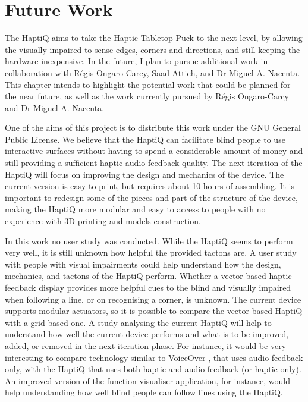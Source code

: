 \chapter{Future Work}
\label{chap:futureWork}

The HaptiQ aims to take the Haptic Tabletop Puck to the next level, by allowing the visually impaired to sense edges, corners and directions, and still keeping the hardware inexpensive. In the future, I plan to pursue additional work in collaboration with Régis Ongaro-Carcy, Saad Attieh, and Dr Miguel A. Nacenta. This chapter intends to highlight the potential work that could be planned for the near future, as well as the work currently pursued by Régis Ongaro-Carcy and Dr Miguel A. Nacenta. 

One of the aims of this project is to distribute this work under the GNU General Public License. We believe that the HaptiQ can facilitate blind people to use interactive surfaces without having to spend a considerable amount of money and still providing a sufficient haptic-audio feedback quality. 
The next iteration of the HaptiQ will focus on improving the design and mechanics of the device. The current version is easy to print, but requires about 10 hours of assembling. It is important to redesign some of the pieces and part of the structure of the device, making the HaptiQ more modular and easy to access to people with no experience with 3D printing and models construction. 

In this work no user study was conducted. While the HaptiQ seems to perform very well, it is still unknown how helpful the provided tactons are. A user study with people with visual impairments could help understand how the design, mechanics, and tactons of the HaptiQ perform. Whether a vector-based haptic feedback display provides more helpful cues to the blind and visually impaired when following a line, or on recognising a corner, is unknown. The current device supports modular actuators, so it is possible to compare the vector-based HaptiQ with a grid-based one. A study analysing the current HaptiQ will help to understand how well the current device performs and what is to be improved, added, or removed in the next iteration phase. For instance, it would be very interesting to compare technology similar to VoiceOver \cite{voiceOver}, that uses audio feedback only, with the HaptiQ that uses both haptic and audio feedback (or haptic only). An improved version of the function visualiser application, for instance, would help understanding how well blind people can follow lines using the HaptiQ.  

